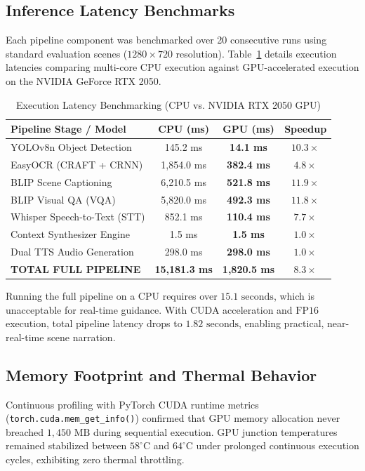 \documentclass[conference]{IEEEtran}
\begin{document}
\subsection{Inference Latency Benchmarks}
Each pipeline component was benchmarked over 20 consecutive runs using standard evaluation scenes ($1280 \times 720$ resolution). Table~\ref{tab:latency} details execution latencies comparing multi-core CPU execution against GPU-accelerated execution on the NVIDIA GeForce RTX 2050.

\begin{table}[htbp]
\caption{Execution Latency Benchmarking (CPU vs. NVIDIA RTX 2050 GPU)}
\begin{center}
\begin{tabular}{lccc}
\toprule
\textbf{Pipeline Stage / Model} & \textbf{CPU (ms)} & \textbf{GPU (ms)} & \textbf{Speedup} \\
\midrule
YOLOv8n Object Detection & 145.2 ms & \textbf{14.1 ms} & $10.3\times$ \\
EasyOCR (CRAFT + CRNN) & 1,854.0 ms & \textbf{382.4 ms} & $4.8\times$ \\
BLIP Scene Captioning & 6,210.5 ms & \textbf{521.8 ms} & $11.9\times$ \\
BLIP Visual QA (VQA) & 5,820.0 ms & \textbf{492.3 ms} & $11.8\times$ \\
Whisper Speech-to-Text (STT) & 852.1 ms & \textbf{110.4 ms} & $7.7\times$ \\
Context Synthesizer Engine & 1.5 ms & \textbf{1.5 ms} & $1.0\times$ \\
Dual TTS Audio Generation & 298.0 ms & \textbf{298.0 ms} & $1.0\times$ \\
\midrule
\textbf{TOTAL FULL PIPELINE} & \textbf{15,181.3 ms} & \textbf{1,820.5 ms} & $\mathbf{8.3\times}$ \\
\bottomrule
\end{tabular}
\label{tab:latency}
\end{center}
\end{table}

Running the full pipeline on a CPU requires over $15.1\text{ seconds}$, which is unacceptable for real-time guidance. With CUDA acceleration and $\text{FP16}$ execution, total pipeline latency drops to \textbf{$1.82\text{ seconds}$}, enabling practical, near-real-time scene narration.

\subsection{Memory Footprint and Thermal Behavior}
Continuous profiling with PyTorch CUDA runtime metrics (\texttt{torch.cuda.mem\_get\_info()}) confirmed that GPU memory allocation never breached $1,450\text{ MB}$ during sequential execution. GPU junction temperatures remained stabilized between $58^\circ\text{C}$ and $64^\circ\text{C}$ under prolonged continuous execution cycles, exhibiting zero thermal throttling.
\end{document}
